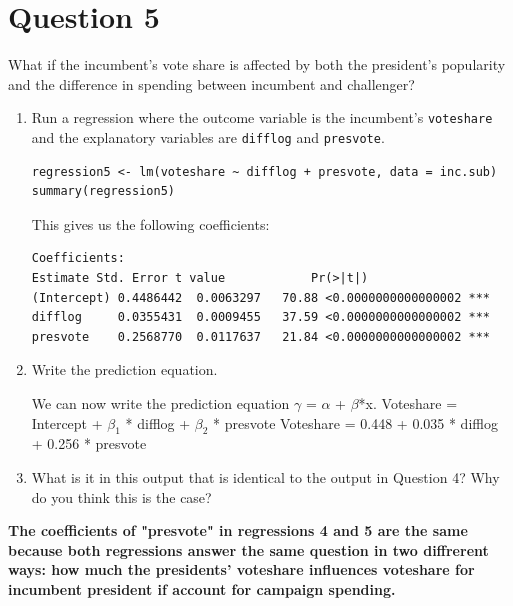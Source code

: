 \documentclass[12pt,letterpaper]{article}
\begin{document}
\section*{Question 5}
\noindent What if the incumbent's vote share is affected by both the president's popularity and the difference in spending between incumbent and challenger? 
\begin{enumerate}
	\item Run a regression where the outcome variable is the incumbent's \texttt{voteshare} and the explanatory variables are \texttt{difflog} and \texttt{presvote}.
	
	\begin{BVerbatim}
regression5 <- lm(voteshare ~ difflog + presvote, data = inc.sub)
summary(regression5)
	\end{BVerbatim}
	
	This gives us the following coefficients: 
	
	\begin{BVerbatim}
Coefficients:
Estimate Std. Error t value            Pr(>|t|)    
(Intercept) 0.4486442  0.0063297   70.88 <0.0000000000000002 ***
difflog     0.0355431  0.0009455   37.59 <0.0000000000000002 ***
presvote    0.2568770  0.0117637   21.84 <0.0000000000000002 ***
	\end{BVerbatim}
	
	
	\item Write the prediction equation.	\vspace{.5 cm}
	
	We can now write the prediction equation $\gamma$ = $\alpha$ + $\beta$*x.
	\newline Voteshare = Intercept + $\beta_1$ * difflog + $\beta_2$ * presvote
	\newline Voteshare	 = 0.448 + 0.035 * difflog + 0.256 * presvote
	
	
	
	\item What is it in this output that is identical to the output in Question 4? Why do you think this is the case?
\end{enumerate}

\textbf{The coefficients of "presvote" in regressions 4 and 5 are the same because both regressions answer the same question in two diffrerent ways: how much the presidents' voteshare influences voteshare for incumbent president if account for campaign spending.}
\end{document}
